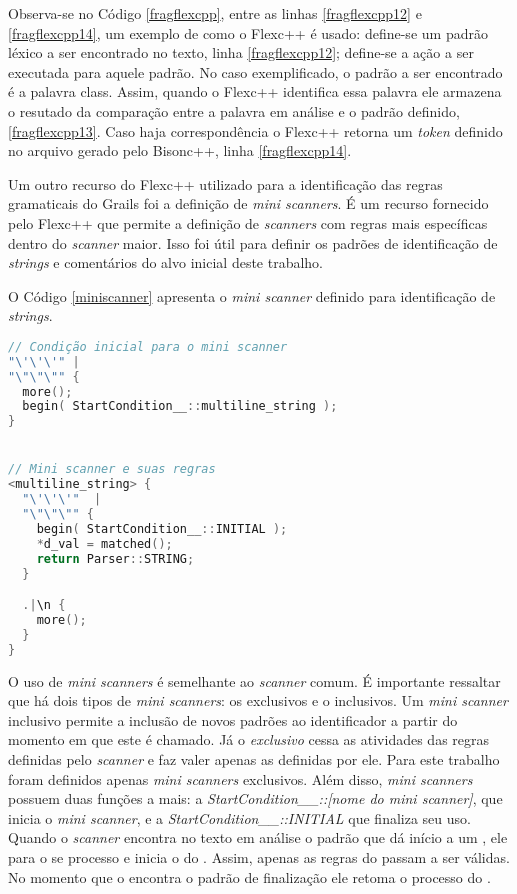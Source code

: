 Observa-se no Código \ref{fragflexcpp}, entre as linhas \ref{fragflexcpp12} e \ref{fragflexcpp14}, um exemplo de como o \textsf{Flexc++} é usado:
define-se um padrão léxico a ser encontrado no texto, linha \ref{fragflexcpp12};
define-se a ação a ser executada para aquele padrão. No caso exemplificado, o
padrão a ser encontrado é a palavra \textsf{class}. Assim, quando o Flexc++
identifica essa palavra ele armazena o resutado da comparação entre a palavra em
análise e o padrão definido, \ref{fragflexcpp13}. Caso haja correspondência o
Flexc++ retorna um \textit{token} definido no arquivo gerado pelo
\textsf{Bisonc++}, linha \ref{fragflexcpp14}.

Um outro recurso do \textsf{Flexc++} utilizado para a identificação das regras
gramaticais do \textsf{Grails} foi a definição de \textit{mini scanners}. É um
recurso fornecido pelo \textsf{Flexc++} que permite a definição de \textit{scanners}
com regras mais específicas dentro do \textit{scanner} maior. Isso foi útil para
definir os padrões de identificação de \textit{strings} e comentários do alvo inicial deste trabalho.

O Código \ref{miniscanner} apresenta o \textit{mini scanner} definido para
identificação de \textit{strings}.

\begin{lstlisting}[language=C++, label=miniscanner, caption=Implementação do Mini scanner de Strings]
// Condição inicial para o mini scanner
"\'\'\'" |
"\"\"\"" {
  more();
  begin( StartCondition__::multiline_string );
}


// Mini scanner e suas regras
<multiline_string> {
  "\'\'\'"  |
  "\"\"\"" {
    begin( StartCondition__::INITIAL );
    *d_val = matched();
    return Parser::STRING;
  }

  .|\n {
    more();
  }
}
\end{lstlisting}

O uso de \textit{mini scanners} é semelhante ao \textit{scanner} comum. É
importante ressaltar que há dois tipos de \textit{mini scanners}: os exclusivos
e o inclusivos. Um \textit{mini scanner} inclusivo permite a inclusão de novos
padrões ao identificador a partir do momento em que este é chamado. Já o
\textit{exclusivo} cessa as atividades das regras definidas pelo \textit{scanner}
e faz valer apenas as definidas por ele. Para este trabalho foram definidos apenas
\textit{mini scanners} exclusivos. Além disso, \textit{mini scanners} possuem
duas funções a mais: a \textit{StartCondition\_\_::[nome do mini scanner]}, que
inicia o \textit{mini scanner}, e a \textit{StartCondition\_\_::INITIAL} que
finaliza seu uso. Quando o \textit{scanner} encontra no texto em análise o
padrão que dá início a um \miniscanner, ele para o se processo e
inicia o do \miniscanner. Assim, apenas as regras do \miniscanner passam a ser
válidas. No momento que o \miniscanner encontra o padrão de finalização
ele retoma o processo do \scanner.

